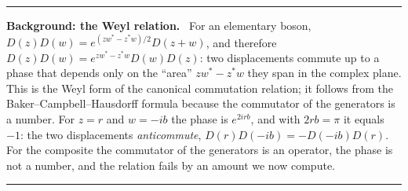 \documentclass[11pt,a4paper]{article}
\newenvironment{background}[1]{\par\medskip\noindent\hrule\smallskip\noindent\textbf{Background: #1.}\ \ignorespaces}{\par\smallskip\noindent\hrule\medskip}
\begin{document}
\begin{background}{the Weyl relation}
For an elementary boson, $D(z)D(w)=e^{(zw^*-z^*w)/2}D(z+w)$, and therefore $D(z)D(w)=e^{zw^*-z^*w}D(w)D(z)$: two displacements commute up to a phase that depends only on the ``area'' $zw^*-z^*w$ they span in the complex plane. This is the Weyl form of the canonical commutation relation; it follows from the Baker--Campbell--Hausdorff formula because the commutator of the generators is a number. For $z=r$ and $w=-ib$ the phase is $e^{2irb}$, and with $2rb=\pi$ it equals $-1$: the two displacements \emph{anticommute}, $D(r)D(-ib)=-D(-ib)D(r)$. For the composite the commutator of the generators is an operator, the phase is not a number, and the relation fails by an amount we now compute.
\end{background}
\end{document}

